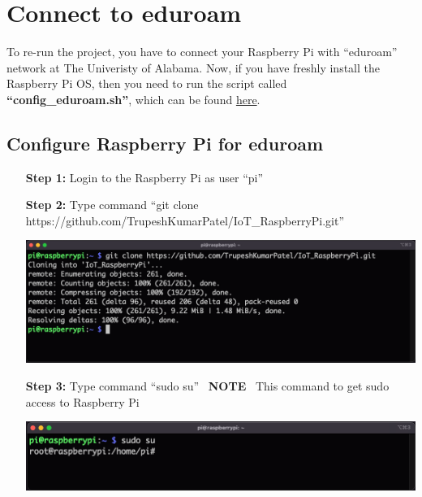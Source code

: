 \section{Connect to eduroam}	\label{sec:run-eduroam}
	 To re-run the project, you have to connect your Raspberry Pi with ``eduroam'' network at The Univeristy of Alabama. Now, if you have freshly install the Raspberry Pi OS, then you need to run the script called \textbf{``config\_eduroam.sh''}, which can be found \href{https://github.com/TrupeshKumarPatel/IoT_RaspberryPi/tree/main/source_code/eduroam_config}{here}. 
	 
	 \subsection{Configure Raspberry Pi for eduroam}
		\begin{itemize}[leftmargin=1.8cm]
			\item[\textbf{Step 1:}] Login to the Raspberry Pi as user ``pi'' %
			\item[\textbf{Step 2:}] Type command ``git clone https://github.com/TrupeshKumarPatel/IoT\_RaspberryPi.git''\\
				\begin{minipage}{\textwidth}
					\vspace{2mm}
					\includegraphics[scale=0.35]{Images/raspberry_pi/eduroam_config/clone_git.png}
					\vspace{2mm}
				\end{minipage}
			\item[\textbf{Step 3:}] Type command ``sudo su'' ~\danger\textbf{NOTE} ~This command to get sudo access to Raspberry Pi \danger\\
				\begin{minipage}{\textwidth}
					\vspace{2mm}
					\includegraphics[scale=0.35]{Images/raspberry_pi/eduroam_config/sudo_login.png}

\end{minipage}
\end{itemize}
